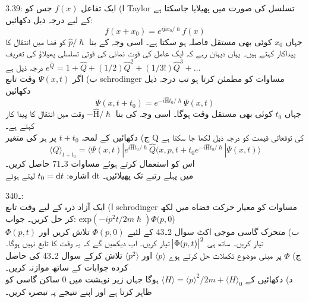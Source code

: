  3.39:
ا) ایک تفاعل
 \(f(x)\)
 جس کو Taylor تسلسل کی صورت میں پھیلایا جاسکتا ہے کے لیے درجہ ذيل  دکھائیں:\\
\[f(x+x_{0})=e^{i\hat{p}x_{0}/\hslash}f(x)\]
جہاں
\(x_{0}\)
کوئی بھی مستقل فاصلہ ہو سکتا ہے۔ اسی وجہ کے بنا 
\(\hat{p}/\hslash\)
کو فضا میں  انتقال کا پیداکار کہتے ہیں۔ یہاں دیہان رہے کہ ایک عامل کی قوت نمائی کی قوتی تسلسلی پھیلاؤ کی تعریف درجہ ذیل ہے
\(e^{\hat{Q}}=1+\hat{Q}+(1/2)\hat{Q}^{2}+(1/3!)\hat{Q}^{3}+\dotsc\)\\
ب) اگر
\(\Psi(x,t)\)
وقت تابع schrodinger مساوات کو مطمئن کرتا ہو تب درجہ ذیل دکھائیں\\
\[\Psi(x,t+t_{0})=e^{-i\hat{\text{H}}t_{0}/\hslash}\Psi(x,t)\]
جہاں
\(t_{0}\)
کوئی بھی مستقل وقت ہوگا۔ اسی وجہ کی بنا
\(-\hat{\text{H}}/\hslash\)
وقت میں انتقال کا پیدا کار کہتے ہے۔\\
ج) دکھائیں کے لمحہ
\(t+t_{0}\)
پر ہر کی متغير Q کی توقعاتی قیمت کو درجہ ذيل لکھا جا سکتا ہے\\
\[\langle Q \rangle _{t+t_{0}}=\langle \Psi(x,t)|e^{i\hat{\text{H}}t_{0}/\hslash}\hat{Q}(x,p,t+t_{0}e^{-i\hat{\text{H}}t_{0}/\hslash}|\Psi(x,t)\rangle\]
اس کو استعمال کرتے ہوئے مساوات 3۔71 حاصل كریں۔\\
اشاره:
 \(t_{0}=\dif{t}\) 
لیتے ہوئے dt میں پہلے رتبے تک پھیلائیں۔

 3۔40:\\
ا) ایک آزاد ذرہ کے لیے وقت تابع schrodinger مساوات کو معیار حرکت فضاه میں لکھ کر حل کریں۔
جواب:  
\(\text{exp}(-ip^{2}t/2m\hslash)\Phi(p,0\))\\
ب) متحرک گاسی موجی اکٹ سوال 2۔43 کے لئیے
\(\Phi(p,0)\)
تلاش كريں اور
\(\Phi(p,t)\)
تیار كریں۔ ساتھ ہی
\(\abs{\Phi(p,t)}^{2}\)
تیار كريں۔ اب دیکھیں گے کہ یہ وقت کا تابع نہیں ہوگا۔\\
ج)
\(\Phi\)
پر مبنی موضوع تكملات حل کرتے ہوے
\(\langle p \rangle\)
اور
\(\langle p^{2} \rangle\)
تلاش کرکے سوال 2۔43 کی حاصل كرده جوابات کے ساتھ موازنہ كريں۔\\
د) دکھائیں کے
\(\langle H \rangle =\langle p \rangle ^{2}/2m+\langle H \rangle _{0}\)
ہوگا جہاں زیر نوہشت میں 0 ساکن گاسی کو ظاہر کرتا ہے اور اپنے نتیجے پہ تبصرہ کریں۔


